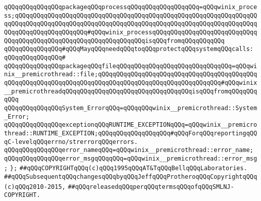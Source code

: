 \verb|qQQqqQQqqQQqqQQqpackageqQQqprocessqQQqqQQqqQQqqQQqqQQq=qQQqwinix_process;qQQqqQQqqQQqqQQqqQQqqQQqqQQqqQQqqQQqqQQqqQQqqQQqqQQqqQQqqQQqqQQqqQQqqQQqqQQqqQQqqQQqqQQqqQQqqQQqqQQqqQQqqQQqqQQqqQQqqQQqqQQqqQQqqQQqqQQqqQQqqQQqqQQqqQQqqQQqqQQq#qQQqwinix_processqQQqqQQqqQQqqQQqqQQqqQQqqQQqqQQqqQQqqQQqqQQqqQQqqQQqqQQqqQQqqQQqqQQqisqQQqfromqQQqqQQqqQQq|\newline
\newline
\verb|qQQqqQQqqQQqqQQq#qQQqMayqQQqneedqQQqtoqQQqprotectqQQqsystemqQQqcalls:|\newline
\verb|qQQqqQQqqQQqqQQq#|\newline
\verb|qQQqqQQqqQQqqQQqpackageqQQqfileqQQqqQQqqQQqqQQqqQQqqQQqqQQqqQQq=qQQqwinix__premicrothread::file;qQQqqQQqqQQqqQQqqQQqqQQqqQQqqQQqqQQqqQQqqQQqqQQqqQQqqQQqqQQqqQQqqQQqqQQqqQQqqQQqqQQqqQQqqQQqqQQqqQQqqQQq#qQQqwinix__premicrothreadqQQqqQQqqQQqqQQqqQQqqQQqqQQqqQQqqQQqisqQQqfromqQQqqQQqqQQq|\newline
\newline
\verb|qQQqqQQqqQQqqQQqSystem_ErrorqQQq=qQQqqQQqwinix__premicrothread::System_Error;|\newline
\newline
\verb|qQQqqQQqqQQqqQQqexceptionqQQqRUNTIME_EXCEPTIONqQQq=qQQqwinix__premicrothread::RUNTIME_EXCEPTION;qQQqqQQqqQQqqQQqqQQq#qQQqForqQQqreportingqQQqC-levelqQQqerrno/strerrorqQQqerrors.|\newline
\newline
\verb|qQQqqQQqqQQqqQQqerror_nameqQQq=qQQqwinix__premicrothread::error_name;|\newline
\verb|qQQqqQQqqQQqqQQqerror_msgqQQqqQQq=qQQqwinix__premicrothread::error_msg;|\newline
\verb|};|\newline
\newline
\newline
\newline
\newline
\verb|##qQQqCOPYRIGHTqQQq(c)qQQq1995qQQqAT&TqQQqBellqQQqLaboratories.|\newline
\verb|##qQQqSubsequentqQQqchangesqQQqbyqQQqJeffqQQqProtheroqQQqCopyrightqQQq(c)qQQq2010-2015,|\newline
\verb|##qQQqreleasedqQQqperqQQqtermsqQQqofqQQqSMLNJ-COPYRIGHT.|\newline

